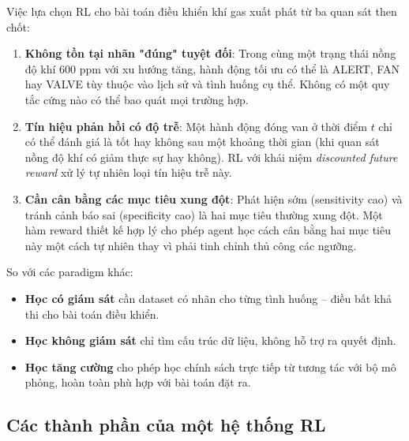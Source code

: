 Việc lựa chọn RL cho bài toán điều khiển khí gas xuất phát từ ba quan sát then chốt:

\begin{enumerate}
  \item \textbf{Không tồn tại nhãn "đúng" tuyệt đối}: Trong cùng một trạng thái nồng độ khí 600 ppm với xu hướng tăng, hành động tối ưu có thể là ALERT, FAN hay VALVE tùy thuộc vào lịch sử và tình huống cụ thể. Không có một quy tắc cứng nào có thể bao quát mọi trường hợp.

  \item \textbf{Tín hiệu phản hồi có độ trễ}: Một hành động đóng van ở thời điểm $t$ chỉ có thể đánh giá là tốt hay không sau một khoảng thời gian (khi quan sát nồng độ khí có giảm thực sự hay không). RL với khái niệm \textit{discounted future reward} xử lý tự nhiên loại tín hiệu trễ này.

  \item \textbf{Cần cân bằng các mục tiêu xung đột}: Phát hiện sớm (sensitivity cao) và tránh cảnh báo sai (specificity cao) là hai mục tiêu thường xung đột. Một hàm reward thiết kế hợp lý cho phép agent học cách cân bằng hai mục tiêu này một cách tự nhiên thay vì phải tinh chỉnh thủ công các ngưỡng.
\end{enumerate}

So với các paradigm khác:
\begin{itemize}
  \item \textbf{Học có giám sát} cần dataset có nhãn cho từng tình huống – điều bất khả thi cho bài toán điều khiển.
  \item \textbf{Học không giám sát} chỉ tìm cấu trúc dữ liệu, không hỗ trợ ra quyết định.
  \item \textbf{Học tăng cường} cho phép học chính sách trực tiếp từ tương tác với bộ mô phỏng, hoàn toàn phù hợp với bài toán đặt ra.
\end{itemize}

\subsection{Các thành phần của một hệ thống RL}

